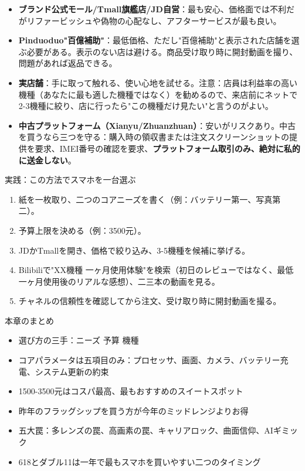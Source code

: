 
\begin{itemize}
  \item \textbf{ブランド公式モール/Tmall旗艦店/JD自営}：最も安心、価格面では不利だがリファービッシュや偽物の心配なし、アフターサービスが最も良い。
  \item \textbf{Pinduoduo"百億補助"}：最低価格、ただし"百億補助"と表示された店舗を選ぶ必要がある。表示のない店は避ける。商品受け取り時に開封動画を撮り、問題があれば返品できる。
  \item \textbf{実店舗}：手に取って触れる、使い心地を試せる。注意：店員は利益率の高い機種（あなたに最も適した機種ではなく）を勧めるので、来店前にネットで2-3機種に絞り、店に行ったら"この機種だけ見たい"と言うのがよい。
  \item \textbf{中古プラットフォーム（Xianyu/Zhuanzhuan）}：安いがリスクあり。中古を買うなら三つを守る：購入時の領収書または注文スクリーンショットの提供を要求、IMEI番号の確認を要求、\textbf{プラットフォーム取引のみ、絶対に私的に送金しない}。
\end{itemize}

\begin{tcbpractice}{実践：この方法でスマホを一台選ぶ}
\begin{enumerate}
  \item 紙を一枚取り、二つのコアニーズを書く（例：バッテリー第一、写真第二）。
  \item 予算上限を決める（例：3500元）。
  \item JDかTmallを開き、価格で絞り込み、3-5機種を候補に挙げる。
  \item Bilibiliで"XX機種 一ヶ月使用体験"を検索（初日のレビューではなく、最低一ヶ月使用後のリアルな感想）、二三本の動画を見る。
  \item チャネルの信頼性を確認してから注文、受け取り時に開封動画を撮る。
\end{enumerate}

\end{tcbpractice}

\begin{tcbsummary}{本章のまとめ}
\begin{itemize}
  \item 選び方の三手：ニーズ 予算 機種
  \item コアパラメータは五項目のみ：プロセッサ、画面、カメラ、バッテリー充電、システム更新の約束
  \item 1500-3500元はコスパ最高、最もおすすめのスイートスポット
  \item 昨年のフラッグシップを買う方が今年のミッドレンジよりお得
  \item 五大罠：多レンズの罠、高画素の罠、キャリアロック、曲面信仰、AIギミック
  \item 618とダブル11は一年で最もスマホを買いやすい二つのタイミング
\end{itemize}

\end{tcbsummary}
